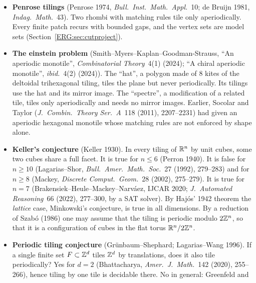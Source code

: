 \begin{itemize}[leftmargin=1.2em,itemsep=0.45em]
  Robinson, \emph{Invent.\ Math.}~12 (1971)). It is undecidable whether a finite set of Wang tiles (unit
  squares with coloured edges, matched edge to edge, no rotations) tiles the plane. The proof needs, and
  produces, an \emph{aperiodic} tile set: one that tiles, but only non-periodically. Berger used $20426$
  tiles, and Robinson used $6$ tiles (allowing rotations and reflections). The minimum is $11$ Wang tiles, on $4$ colours (Jeandel--Rao,
  \emph{Advances in Combinatorics} 2021).
\item \textbf{Penrose tilings} (Penrose 1974, \emph{Bull.\ Inst.\ Math.\ Appl.}~10; de Bruijn 1981,
  \emph{Indag.\ Math.}~43). Two rhombi with matching rules tile only aperiodically. Every finite patch
  recurs with bounded gaps, and the vertex sets are model sets (Section~\ref{ERG:sec:cutproject}).
\item \textbf{The einstein problem} (Smith--Myers--Kaplan--Goodman-Strauss, ``An aperiodic monotile'',
  \emph{Combinatorial Theory}~4(1) (2024); ``A chiral aperiodic monotile'', \emph{ibid.}~4(2) (2024)). The
  ``hat'', a polygon made of $8$ kites of the deltoidal trihexagonal tiling, tiles the plane but never
  periodically. Its tilings use the hat and its mirror image. The ``spectre'', a modification of a related
  tile, tiles only aperiodically and needs no mirror images. Earlier, Socolar and Taylor (\emph{J.\ Combin.\ Theory Ser.~A}~118 (2011), 2207--2231) had
  given an aperiodic hexagonal monotile whose matching rules are not enforced by shape alone.
\item \textbf{Keller's conjecture} (Keller 1930). In every tiling of $\mathbb{R}^n$ by unit cubes, some two cubes
  share a full facet. It is true for $n\le6$ (Perron 1940). It is false for $n\ge10$ (Lagarias--Shor,
  \emph{Bull.\ Amer.\ Math.\ Soc.}~27 (1992), 279--283) and for $n\ge8$ (Mackey, \emph{Discrete Comput.\
  Geom.}~28 (2002), 275--279). It is true for $n=7$ (Brakensiek--Heule--Mackey--Narv\'aez, IJCAR 2020;
  \emph{J.\ Automated Reasoning}~66 (2022), 277--300, by a SAT solver). By Haj\'os' 1942 theorem the
  \emph{lattice} case, Minkowski's conjecture, is true in all dimensions. By a reduction of Szab\'o (1986)
  one may assume that the tiling is periodic modulo $2\mathbb{Z}^n$, so that it is a configuration of cubes in the
  flat torus $\mathbb{R}^n/2\mathbb{Z}^n$.
\item \textbf{Periodic tiling conjecture} (Grünbaum--Shephard; Lagarias--Wang 1996). If a single finite set
  $F\subset\mathbb{Z}^d$ tiles $\mathbb{Z}^d$ by translations, does it also tile periodically? Yes for $d=2$ (Bhattacharya,
  \emph{Amer.\ J.\ Math.}~142 (2020), 255--266), hence tiling by one tile is decidable there. No in general: Greenfeld and

\end{itemize}

